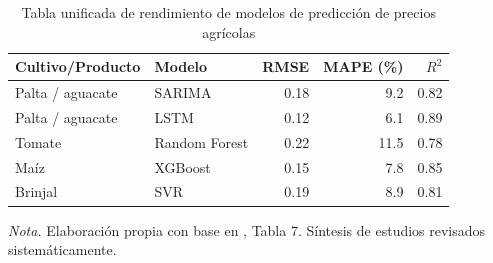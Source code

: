 \begin{table}[H]
\centering
\caption{Tabla unificada de rendimiento de modelos de predicci\'on de precios agr\'icolas}
\label{tab:rendimiento_modelos}
\small
\begin{tabular}{llrrr}
\toprule
\textbf{Cultivo/Producto} & \textbf{Modelo} & \textbf{RMSE} & \textbf{MAPE (\%)} & \textbf{$R^2$} \\
\midrule
Palta / aguacate  & SARIMA       & 0.18 & 9.2  & 0.82 \\
Palta / aguacate  & LSTM         & 0.12 & 6.1  & 0.89 \\
Tomate            & Random Forest & 0.22 & 11.5 & 0.78 \\
Ma\'iz             & XGBoost      & 0.15 & 7.8  & 0.85 \\
Brinjal           & SVR          & 0.19 & 8.9  & 0.81 \\
\bottomrule
\end{tabular}
\parbox{0.94\textwidth}{\small \textit{Nota.} Elaboraci\'on propia con base en \citep{Theofilou2025}, Tabla 7. S\'intesis de estudios revisados sistem\'aticamente.}
\end{table}
